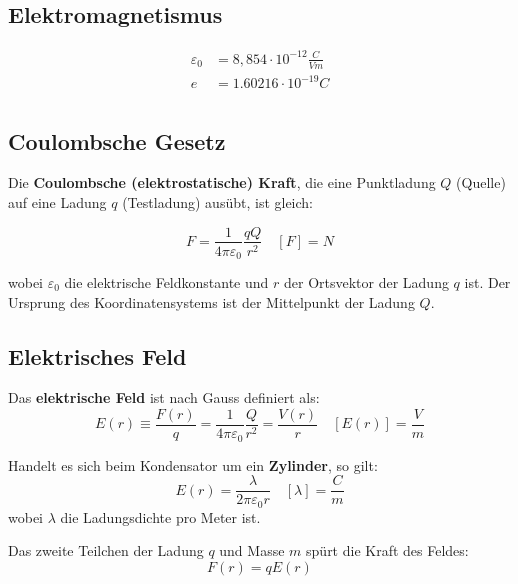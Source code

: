 \documentclass[7pt]{article}
\begin{document}
\begin{multicols*}{3}
	
\section{Elektromagnetismus}

\begin{equation*}
\begin{split}
	\varepsilon_0 & = 8,854 \cdot 10^{-12} \frac{C}{Vm} \\
	e & = 1.60216 \cdot 10^{-19} C \\
\end{split}
\end{equation*}

\subsection{Coulombsche Gesetz}

Die \textbf{Coulombsche (elektrostatische) Kraft}, die eine Punktladung $Q$ (Quelle) auf eine Ladung $q$ (Testladung) aus{\"u}bt, ist gleich:

\begin{equation*}
	F = \frac{1}{4\pi\varepsilon_0}\frac{qQ}{r^2} \quad [F] = N
\end{equation*}

wobei $\varepsilon_0$ die elektrische Feldkonstante und $r$ der Ortsvektor der Ladung $q$ ist. Der Ursprung des Koordinatensystems ist der Mittelpunkt der Ladung $Q$. \\

\subsection{Elektrisches Feld}

Das \textbf{elektrische Feld} ist nach Gauss definiert als:
\begin{equation*}
	E(r) \equiv \frac{F(r)}{q} = \frac{1}{4\pi\varepsilon_0}\frac{Q}{r^2} = \frac{V(r)}{r} \quad[E(r)] = \frac{V}{m}
\end{equation*}

Handelt es sich beim Kondensator um ein \textbf{Zylinder}, so gilt:
\begin{equation*}
	E(r)=\frac {\lambda }{2\pi \varepsilon_0 r} \quad [\lambda] = \frac{C}{m}
\end{equation*}
wobei $\lambda$ die Ladungsdichte pro Meter ist.

Das zweite Teilchen der Ladung $q$ und Masse $m$ sp{\"u}rt die Kraft des Feldes:
\begin{equation*}
	F(r) = qE(r)
\end{equation*}


\end{multicols*}
\end{document}
